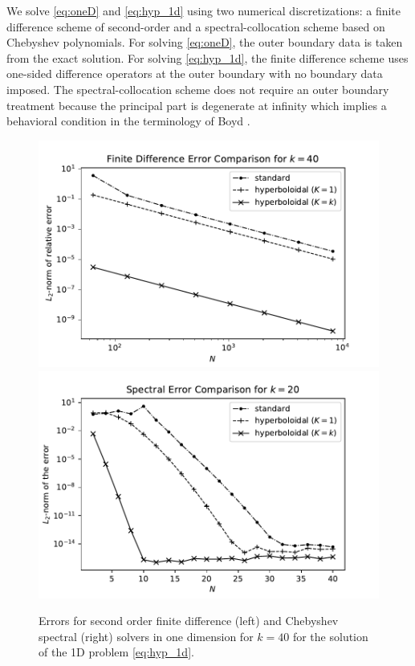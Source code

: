 \documentclass[final,onefignum,onetabnum]{siamart190516}
\begin{document}
We solve \eqref{eq:oneD} and \eqref{eq:hyp_1d} using two numerical discretizations: a finite difference scheme of second-order and a spectral-collocation scheme based on Chebyshev polynomials. For solving \eqref{eq:oneD}, the outer boundary data is taken from the exact solution. For solving \eqref{eq:hyp_1d}, the finite difference scheme uses one-sided difference operators at the outer boundary with no boundary data imposed. The spectral-collocation scheme does not require an outer boundary treatment because the principal part is degenerate at infinity which implies a behavioral condition in the terminology of Boyd \cite{boyd2001chebyshev}.

\begin{figure}[tbhp]
	\centering
	\includegraphics[scale=0.4]{figs/fd_err_1d}
	\includegraphics[scale=0.4]{figs/sp_err_1d}
	\caption{Errors for second order finite difference (left) and Chebyshev spectral (right) solvers in one dimension for $k=40$ for the solution of the 1D problem \eqref{eq:hyp_1d}.}
	\label{fig:errs_oned}
\end{figure}
\end{document}
